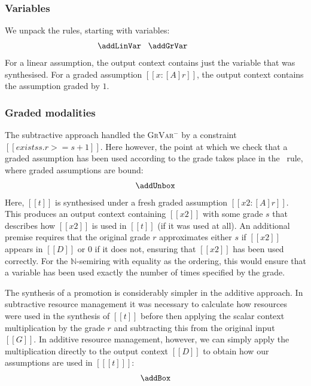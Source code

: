   \subsubsection{Variables}
  We unpack the rules, starting with variables:
%
\begin{align*}
  \begin{array}{c}
  \hspace{-3em}\addLinVar
  \;\;\;
  \addGrVar
  \end{array}
  \end{align*}
%
For a linear assumption, the output context contains just the variable that was
synthesised. For a graded assumption $[[x : [A] r]]$, the output context
contains the assumption graded by $1$. 

\subsubsection{Graded modalities}
The subtractive approach handled the \textsc{GrVar$^{-}$}
by a constraint $[[ exists s . r >= s + 1]]$. Here however, the
point at which we check that a graded assumption has been used
according to the grade takes place in the \addUnboxName\ rule, where graded
assumptions are bound:
%
\begin{align*}
  \addUnbox
  \end{align*}
%
Here, $[[t]]$ is synthesised under a fresh graded assumption $[[ x2 : [A] r]]$.
This produces an output context containing $[[x2]]$ with some grade $s$ that
describes how $[[x2]]$ is used in $[[t]]$ (if it was used at all). An additional
premise requires that the original grade $r$ approximates either $s$ if $[[x2]]$
appears in $[[D]]$ or $0$ if it does not, ensuring that $[[x2]]$ has been used
correctly. For the $\mathbb{N}$-semiring with equality as the ordering, this
would ensure that a variable has been used exactly the number of times specified
by the grade.

The synthesis of a promotion is considerably simpler in the additive
approach. In subtractive resource management it was necessary to calculate how
resources were used in the synthesis of $[[t]]$ before then applying the
scalar context multiplication by the grade $r$ and subtracting this from the
original input $[[G]]$. In additive resource management, however, we can simply
apply the multiplication directly to the output context $[[D]]$ to obtain how
our assumptions are used in $[[ [t] ]]$:
%
\begin{align*}
  \addBox
\end{align*}

